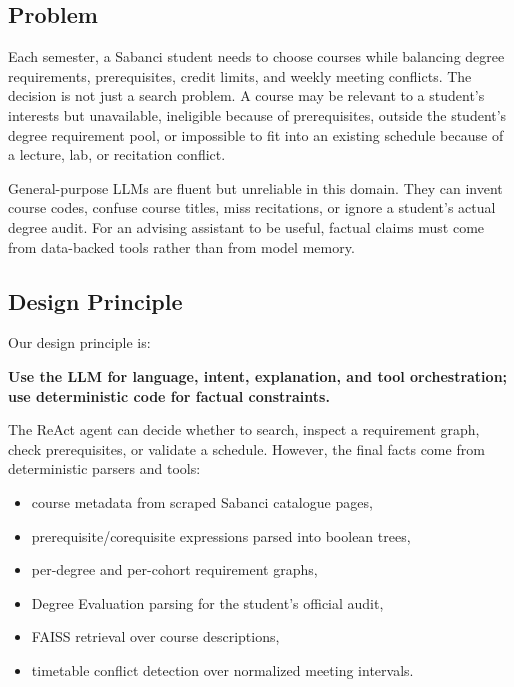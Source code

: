 \documentclass[10pt,letterpaper]{article}
\begin{document}
\subsection{Problem}
Each semester, a Sabanci student needs to choose courses while balancing degree requirements, prerequisites, credit limits, and weekly meeting conflicts. The decision is not just a search problem. A course may be relevant to a student's interests but unavailable, ineligible because of prerequisites, outside the student's degree requirement pool, or impossible to fit into an existing schedule because of a lecture, lab, or recitation conflict.

General-purpose LLMs are fluent but unreliable in this domain. They can invent course codes, confuse course titles, miss recitations, or ignore a student's actual degree audit. For an advising assistant to be useful, factual claims must come from data-backed tools rather than from model memory.

\subsection{Design Principle}
Our design principle is:

\begin{center}
\textbf{Use the LLM for language, intent, explanation, and tool orchestration; use deterministic code for factual constraints.}
\end{center}

The ReAct agent can decide whether to search, inspect a requirement graph, check prerequisites, or validate a schedule. However, the final facts come from deterministic parsers and tools:
\begin{itemize}
  \item course metadata from scraped Sabanci catalogue pages,
  \item prerequisite/corequisite expressions parsed into boolean trees,
  \item per-degree and per-cohort requirement graphs,
  \item Degree Evaluation parsing for the student's official audit,
  \item FAISS retrieval over course descriptions,
  \item timetable conflict detection over normalized meeting intervals.
\end{itemize}
\end{document}

